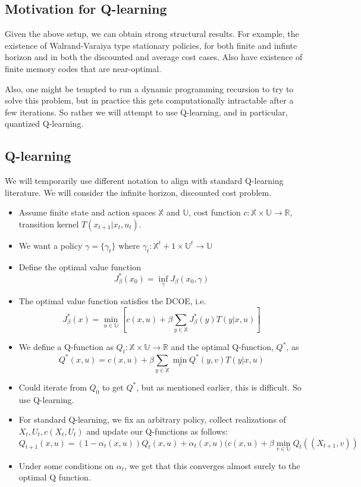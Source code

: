 \documentclass{article}
\begin{document}
\subsection{Motivation for Q-learning}
Given the above setup, we can obtain strong structural results. For example, the existence of Walrand-Varaiya type stationary policies, for both finite and infinte horizon and in both the discounted and average cost cases. Also have existence of finite memory codes that are near-optimal.

Also, one might be tempted to run a dynamic programming recursion to try to solve this problem, but in practice this gets computationally intractable after a few iterations. So rather we will attempt to use Q-learning, and in particular, quantized Q-learning.

\subsection{Q-learning}

We will temporarily use different notation to align with standard Q-learning literature. We will consider the infinite horizon, discounted cost problem.

\begin{itemize}
    \item Assume finite state and action spaces \(\mathbb{X}\) and \(\mathbb{U}\), cost function \( c : \mathbb{X} \times \mathbb{U} \to \mathbb{R} \), transition kernel \(T(x_{t+1} | x_t, u_t)\).
    \item We want a policy \(\gamma = \{\gamma_t\}\) where \( \gamma_t : \mathbb{X}^t+1 \times \mathbb{U}^t \to \mathbb{U} \)
    \item Define the optimal value function
          \[J^*_\beta(x_0) = \inf_{\gamma}J_\beta(x_0,\gamma)\]
    \item The optimal value function satisfies the DCOE, i.e.
          \[J^*_\beta(x) = \min_{u\in\mathbb{U}}\left[ c(x,u) + \beta\sum_{y\in\mathbb{X}}J^*_\beta(y)T(y | x,u) \right]\]
    \item We define a Q-function as \(Q_t : \mathbb{X} \times \mathbb{U} \to \mathbb{R} \) and the optimal Q-function, \(Q^*\), as
          \[ Q^*(x,u) = c(x,u) + \beta \sum_{y \in \mathbb{X}}\min_v Q^*(y,v)T(y|x,u) \]
    \item Could iterate from \(Q_0\) to get \(Q^*\), but as mentioned earlier, this is difficult. So use Q-learning.
    \item For standard Q-learning, we fix an arbitrary policy, collect realizations of \(X_t,U_t,c(X_t,U_t)\) and update our Q-functions as follows:
          \begin{equation}
              Q_{t+1}(x,u) = (1- \alpha_t(x,u))Q_t(x,u) + \alpha_t(x,u)(c(x,u)+\beta \; \underset{v\in\mathbb{U}}{\text{min}} \; Q_t((X_{t+1},v))\label{eq:2}
          \end{equation}
    \item Under some conditions on \(\alpha_t\), we get that this converges almost surely to the optimal Q function.
\end{itemize}
\end{document}
